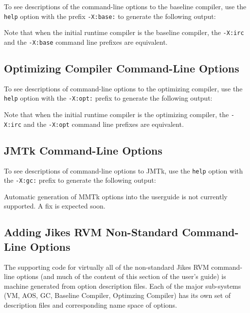To see descriptions of the command-line options to the baseline
compiler, use the {\tt help} option with the prefix {\tt -X:base:} 
to generate the following output:

\T \begin{small}

\T \end{small}
 
Note that when the initial runtime compiler is the baseline compiler, 
the {\tt -X:irc} and the {\tt -X:base} command line prefixes are equivalent.

\subsection{Optimizing Compiler Command-Line Options}
\label{section:nonadaptive:optimizing:options}

To see descriptions of command-line options to the optimizing compiler,
use the {\tt help} option with the {\tt -X:opt:} prefix 
to generate the following output:

\T \begin{tiny}

\T \end{tiny}

Note that when the initial runtime compiler is the optimizing compiler, 
the {\tt -X:irc} and the {\tt -X:opt} command line prefixes are equivalent.

\subsection{JMTk Command-Line Options}
\label{section:mmtkoptions}

To see descriptions of command-line options to JMTk,
use the {\tt help} option with the {\tt -X:gc:} prefix 
to generate the following output:

Automatic generation of MMTk options into the userguide is not
currently supported.  A fix is expected soon.

\T \begin{tiny}
%
\T \end{tiny}

\subsection{Adding Jikes RVM Non-Standard Command-Line Options}
The supporting code for virtually all of the non-standard
Jikes\TMweb{} RVM command-line options (and much of the content of
this section of the user's guide) is machine generated from
option description files.  Each of the major sub-systems (VM, AOS, GC,
Baseline Compiler, Optimzing Compiler) has its own set of description
files and corresponding name space of options. 

